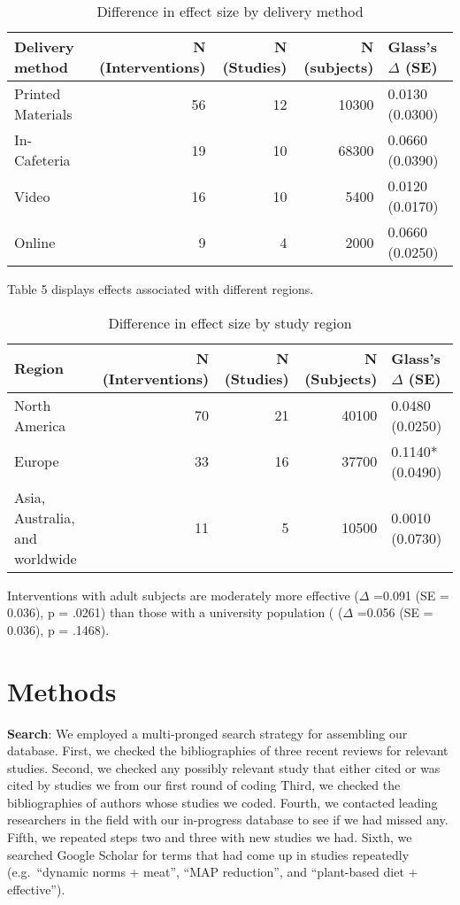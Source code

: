 \documentclass[sn-nature,pdflatex]{sn-jnl}
\begin{document}
\begin{table}[!h]
\centering
\caption{\label{tab:table_four}Difference in effect size by delivery method}
\centering
\begin{tabular}[t]{lrrrl}
\toprule
Delivery method & N (Interventions) & N (Studies) & N (subjects) & Glass's $\Delta$ (SE)\\
\midrule
Printed Materials & 56 & 12 & 10300 & 0.0130 (0.0300)\\
In-Cafeteria & 19 & 10 & 68300 & 0.0660 (0.0390)\\
Video & 16 & 10 & 5400 & 0.0120 (0.0170)\\
Online & 9 & 4 & 2000 & 0.0660 (0.0250)\\
\bottomrule
\end{tabular}
\end{table}

Table 5 displays effects associated with different regions.

\begin{table}[!h]
\centering
\caption{\label{tab:table_five}Difference in effect size by study region}
\centering
\begin{tabular}[t]{lrrrl}
\toprule
Region & N (Interventions) & N (Studies) & N (Subjects) & Glass's $\Delta$ (SE)\\
\midrule
North America & 70 & 21 & 40100 & 0.0480 (0.0250)\\
Europe & 33 & 16 & 37700 & 0.1140* (0.0490)\\
Asia, Australia, and worldwide & 11 & 5 & 10500 & 0.0010 (0.0730)\\
\bottomrule
\end{tabular}
\end{table}

Interventions with adult subjects are moderately more effective
(\(\Delta\) =0.091 (SE = 0.036), p = .0261) than those with a university
population ( (\(\Delta\) =0.056 (SE = 0.036), p = .1468).

\section{Methods}\label{sec3}

\textbf{Search}: We employed a multi-pronged search strategy for
assembling our database. First, we checked the bibliographies of three
recent reviews
\citep{mathur2021meta, bianchi2018conscious, bianchi2018restructuring}
for relevant studies. Second, we checked any possibly relevant study
that either cited or was cited by studies we from our first round of
coding Third, we checked the bibliographies of authors whose studies we
coded. Fourth, we contacted leading researchers in the field with our
in-progress database to see if we had missed any. Fifth, we repeated
steps two and three with new studies we had. Sixth, we searched Google
Scholar for terms that had come up in studies repeatedly (e.g.~``dynamic
norms + meat'', ``MAP reduction'', and ``plant-based diet +
effective'').
\end{document}
